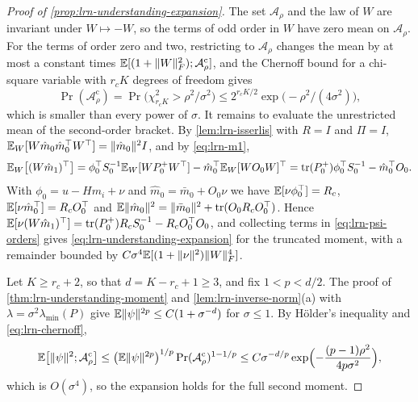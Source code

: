 \begin{proof}[Proof of \cref{prop:lrn-understanding-expansion}]
The set $\mathcal A_\rho$ and the law of $W$ are invariant under $W\mapsto-W$, so the terms of odd order in $W$ have zero mean on $\mathcal A_\rho$. For the terms of order zero and two, restricting to $\mathcal A_\rho$ changes the mean by at most a constant times $\mathbb{E}[(1+\Vert W\Vert_F^2);\mathcal A_\rho^{\mathrm c}]$, and the Chernoff bound for a chi-square variable with $r_cK$ degrees of freedom gives
\begin{equation}\label{eq:lrn-chernoff}
\Pr(\mathcal A_\rho^{\mathrm c})=\Pr\bigl(\chi^2_{r_cK}>\rho^2/\sigma^2\bigr)\le2^{r_cK/2}\exp\bigl(-\rho^2/(4\sigma^2)\bigr),
\end{equation}
which is smaller than every power of $\sigma$. It remains to evaluate the unrestricted mean of the second-order bracket. By \cref{lem:lrn-isserlis} with $R=I$ and $\Pi=I$, $\mathbb{E}_W[W\hat m_0\hat m_0^\top W^\top]=\Vert\hat m_0\Vert^2I$, and by \cref{eq:lrn-m1},
\begin{equation}\label{eq:lrn-cross}
\mathbb{E}_W\bigl[(W\hat m_1)^\top\bigr]=\phi_0^\top S_0^{-1}\mathbb{E}_W[WP_0^+W^\top]-\hat m_0^\top\mathbb{E}_W[WO_0W]^\top=\operatorname{tr}(P_0^+)\phi_0^\top S_0^{-1}-\hat m_0^\top O_0.
\end{equation}
With $\phi_0=u-Hm_i+\nu$ and $\hat m_0=\bar m_0+O_0\nu$ we have $\mathbb{E}[\nu\phi_0^\top]=R_c$, $\mathbb{E}[\nu\hat m_0^\top]=R_cO_0^\top$ and $\mathbb{E}\Vert\hat m_0\Vert^2=\Vert\bar m_0\Vert^2+\operatorname{tr}(O_0R_cO_0^\top)$. Hence $\mathbb{E}[\nu(W\hat m_1)^\top]=\operatorname{tr}(P_0^+)R_cS_0^{-1}-R_cO_0^\top O_0$, and collecting terms in \cref{eq:lrn-psi-orders} gives \cref{eq:lrn-understanding-expansion} for the truncated moment, with a remainder bounded by $C\sigma^4\mathbb{E}[(1+\Vert\nu\Vert^2)\Vert W\Vert_F^4]$.

Let $K\ge r_c+2$, so that $d=K-r_c+1\ge3$, and fix $1<p<d/2$. The proof of \cref{thm:lrn-understanding-moment} and \cref{lem:lrn-inverse-norm}(a) with $\lambda=\sigma^2\lambda_{\min}(P)$ give $\mathbb{E}\Vert\psi\Vert^{2p}\le C(1+\sigma^{-d})$ for $\sigma\le1$. By H\"older's inequality and \cref{eq:lrn-chernoff},
\begin{equation}\label{eq:lrn-holder}
\mathbb{E}\bigl[\Vert\psi\Vert^2;\mathcal A_\rho^{\mathrm c}\bigr]\le\bigl(\mathbb{E}\Vert\psi\Vert^{2p}\bigr)^{1/p}\Pr(\mathcal A_\rho^{\mathrm c})^{1-1/p}\le C\sigma^{-d/p}\exp\Bigl(-\frac{(p-1)\rho^2}{4p\sigma^2}\Bigr),
\end{equation}
which is $O(\sigma^4)$, so the expansion holds for the full second moment.
\end{proof}

